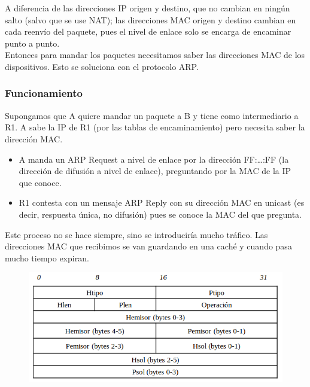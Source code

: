 A diferencia de las direcciones IP origen y destino, que no cambian en ningún salto (salvo que se use \acrshort{NAT}); las direcciones MAC origen y destino cambian en cada reenvío del paquete, pues el nivel de enlace solo se encarga de encaminar punto a punto.\\

Entonces para mandar los paquetes necesitamos saber las direcciones MAC de los dispositivos. Esto se soluciona con el protocolo \acrfull{ARP}. 

\subsubsection{Funcionamiento}
Supongamos que A quiere mandar un paquete a B y tiene como intermediario a R1. A sabe la IP de R1 (por las tablas de encaminamiento) pero necesita saber la dirección MAC. 
\begin{itemize}
    \item A manda un ARP Request a nivel de enlace por la dirección FF:\ldots:FF (la dirección de difusión a nivel de enlace), preguntando por la MAC de la IP que conoce. 
    \item R1 contesta con un mensaje ARP Reply con su dirección MAC en unicast (es decir, respuesta única, no difusión) pues se conoce la MAC del que pregunta.
\end{itemize}

Este proceso no se hace siempre, sino se introduciría mucho tráfico. Las direcciones MAC que recibimos se van guardando en una caché y cuando pasa mucho tiempo expiran.\\

\begin{figure}[H]
    \centering
    \includegraphics[width=0.6\linewidth]{./images/cabecera-arp.png}
\end{figure}


